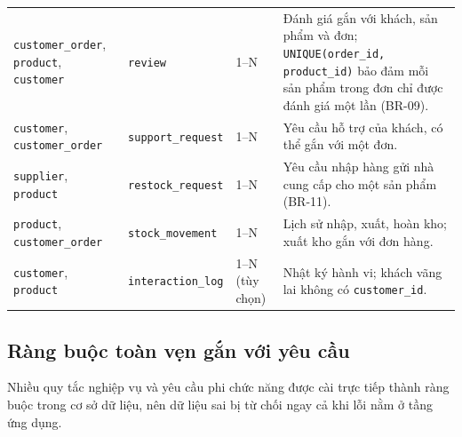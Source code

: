 \documentclass[12pt,a4paper,oneside]{report}
\begin{document}
\begin{longtable}{p{3.2cm}p{3.2cm}p{1.8cm}p{7.6cm}}
\texttt{customer\_order}, \texttt{product}, \texttt{customer} & \texttt{review} & 1--N & Đánh giá gắn với khách, sản phẩm và đơn; \texttt{UNIQUE(order\_id, product\_id)} bảo đảm mỗi sản phẩm trong đơn chỉ được đánh giá một lần (BR-09). \\
\texttt{customer}, \texttt{customer\_order} & \texttt{support\_request} & 1--N & Yêu cầu hỗ trợ của khách, có thể gắn với một đơn. \\
\texttt{supplier}, \texttt{product} & \texttt{restock\_request} & 1--N & Yêu cầu nhập hàng gửi nhà cung cấp cho một sản phẩm (BR-11). \\
\texttt{product}, \texttt{customer\_order} & \texttt{stock\_movement} & 1--N & Lịch sử nhập, xuất, hoàn kho; xuất kho gắn với đơn hàng. \\
\texttt{customer}, \texttt{product} & \texttt{interaction\_log} & 1--N (tùy chọn) & Nhật ký hành vi; khách vãng lai không có \texttt{customer\_id}. \\
\end{longtable}

\subsection{Ràng buộc toàn vẹn gắn với yêu cầu}

Nhiều quy tắc nghiệp vụ và yêu cầu phi chức năng được cài trực tiếp thành ràng buộc trong cơ sở dữ liệu, nên dữ liệu sai bị từ chối ngay cả khi lỗi nằm ở tầng ứng dụng.
\end{document}
